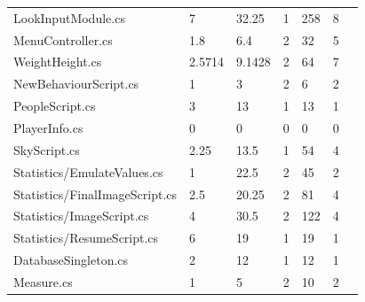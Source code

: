 \begin{table}[htp]
\begin{tabular}{lllllll}
LookInputModule.cs & 7\cellcolor[HTML]{FFCE93} & 32.25\cellcolor[HTML]{FFCE93} & 1\cellcolor[HTML]{9AFF99} & 258\cellcolor[HTML]{FFCE93} & 8\cellcolor[HTML]{9AFF99} \\
MenuController.cs & 1.8\cellcolor[HTML]{9AFF99} & 6.4\cellcolor[HTML]{9AFF99} & 2\cellcolor[HTML]{FFFC9E} & 32\cellcolor[HTML]{9AFF99} & 5\cellcolor[HTML]{9AFF99} \\
WeightHeight.cs & 2.5714\cellcolor[HTML]{9AFF99} & 9.1428\cellcolor[HTML]{9AFF99} & 2\cellcolor[HTML]{FFFC9E} & 64\cellcolor[HTML]{9AFF99} & 7\cellcolor[HTML]{9AFF99} \\
NewBehaviourScript.cs & 1\cellcolor[HTML]{9AFF99} & 3\cellcolor[HTML]{9AFF99} & 2\cellcolor[HTML]{FFFC9E} & 6\cellcolor[HTML]{9AFF99} & 2\cellcolor[HTML]{9AFF99} \\
PeopleScript.cs & 3\cellcolor[HTML]{9AFF99} & 13\cellcolor[HTML]{FFCE93} & 1\cellcolor[HTML]{9AFF99} & 13\cellcolor[HTML]{9AFF99} & 1\cellcolor[HTML]{9AFF99} \\
PlayerInfo.cs & 0\cellcolor[HTML]{9AFF99} & 0\cellcolor[HTML]{9AFF99} & 0\cellcolor[HTML]{9AFF99} & 0\cellcolor[HTML]{9AFF99} & 0\cellcolor[HTML]{9AFF99} \\
SkyScript.cs & 2.25\cellcolor[HTML]{9AFF99} & 13.5\cellcolor[HTML]{FFCE93} & 1\cellcolor[HTML]{9AFF99} & 54\cellcolor[HTML]{9AFF99} & 4\cellcolor[HTML]{9AFF99} \\
Statistics/EmulateValues.cs & 1\cellcolor[HTML]{9AFF99} & 22.5\cellcolor[HTML]{FFCE93} & 2\cellcolor[HTML]{FFFC9E} & 45\cellcolor[HTML]{9AFF99} & 2\cellcolor[HTML]{9AFF99} \\
Statistics/FinalImageScript.cs & 2.5\cellcolor[HTML]{9AFF99} & 20.25\cellcolor[HTML]{FFCE93} & 2\cellcolor[HTML]{FFFC9E} & 81\cellcolor[HTML]{FFFC9E} & 4\cellcolor[HTML]{9AFF99} \\
Statistics/ImageScript.cs & 4\cellcolor[HTML]{9AFF99} & 30.5\cellcolor[HTML]{FFCE93} & 2\cellcolor[HTML]{FFFC9E} & 122\cellcolor[HTML]{FFFC9E} & 4\cellcolor[HTML]{9AFF99} \\
Statistics/ResumeScript.cs & 6\cellcolor[HTML]{FFFC9E} & 19\cellcolor[HTML]{FFCE93} & 1\cellcolor[HTML]{9AFF99} & 19\cellcolor[HTML]{9AFF99} & 1\cellcolor[HTML]{9AFF99} \\
DatabaseSingleton.cs & 2\cellcolor[HTML]{9AFF99} & 12\cellcolor[HTML]{FFFC9E} & 1\cellcolor[HTML]{9AFF99} & 12\cellcolor[HTML]{9AFF99} & 1\cellcolor[HTML]{9AFF99} \\
Measure.cs & 1\cellcolor[HTML]{9AFF99} & 5\cellcolor[HTML]{9AFF99} & 2\cellcolor[HTML]{FFFC9E} & 10\cellcolor[HTML]{9AFF99} & 2\cellcolor[HTML]{9AFF99} \\

\end{tabular}
\end{table}
